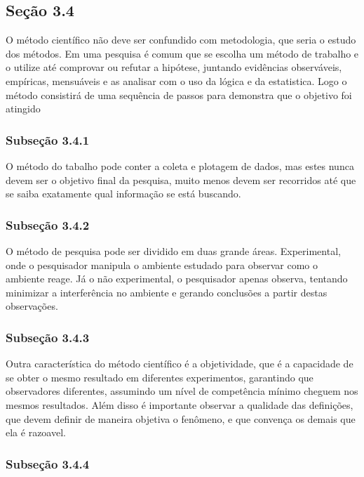 \documentclass[
	12pt,				%
	openright,			%
	oneside,			%
	a4paper,			%
	chapter=TITLE,		%
	subsection=TITLE,	%
	english,			%
	brazilian,				%
	]{abntex2}
\begin{document}
\subsection*{Seção 3.4}

O método científico não deve ser confundido com metodologia, que seria o estudo dos métodos. Em uma pesquisa é comum que se escolha um método de trabalho e o utilize até comprovar ou refutar a hipótese, juntando evidências observáveis, empíricas, mensuáveis e as analisar com o uso da lógica e da estatistica. Logo o método consistirá de uma sequência de passos para demonstra que o objetivo foi atingido

\subsubsection*{Subseção 3.4.1}

O método do tabalho pode conter a coleta e plotagem de dados, mas estes nunca devem ser o objetivo final da pesquisa, muito menos devem ser recorridos até que se saiba exatamente qual informação se está buscando.

\subsubsection*{Subseção 3.4.2}

O método de pesquisa pode ser dividido em duas grande áreas. Experimental, onde o pesquisador manipula o ambiente estudado para observar como o ambiente reage. Já o não experimental, o pesquisador apenas observa, tentando minimizar a interferência no ambiente e gerando conclusões a partir destas observações.

\subsubsection*{Subseção 3.4.3}

Outra característica do método científico é a objetividade, que é a capacidade de se obter o mesmo resultado em diferentes experimentos, garantindo que observadores diferentes, assumindo um nível de competência mínimo cheguem nos mesmos resultados. Além disso é importante observar a qualidade das definições, que devem definir de maneira objetiva o fenômeno, e que convença os demais que ela é razoavel.

\subsubsection*{Subseção 3.4.4}
\end{document}
